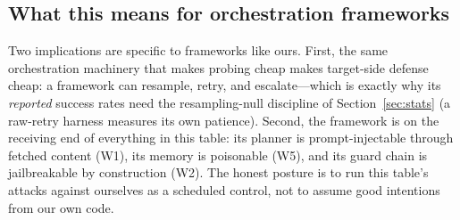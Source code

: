 \subsection{What this means for orchestration frameworks}

Two implications are specific to frameworks like ours. First, the same
orchestration machinery that makes probing cheap makes target-side defense cheap:
a framework can resample, retry, and escalate---which is exactly why its
\emph{reported} success rates need the resampling-null discipline of
Section~\ref{sec:stats} (a raw-retry harness measures its own patience). Second,
the framework is on the receiving end of everything in this table: its planner is
prompt-injectable through fetched content (W1), its memory is poisonable (W5),
and its guard chain is jailbreakable by construction (W2). The honest posture is
to run this table's attacks against ourselves as a scheduled control, not to
assume good intentions from our own code.
